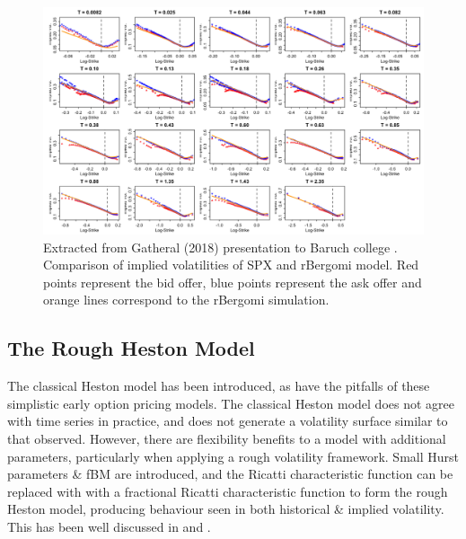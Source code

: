 \documentclass[12pt,oneside]{article}
\begin{document}
\begin{figure}[htpb]
    \centering
    \includegraphics[width=1.0\textwidth ]{figs/Gatheral2018Talk_fig8}
    \caption{Extracted from Gatheral (2018) presentation to Baruch college \cite[Figure~8]{Gatheral2018Talk}. Comparison of implied volatilities of SPX and rBergomi model. Red points represent the bid offer, blue points represent the ask offer and orange lines correspond to the rBergomi simulation.}
    \label{fig:Gatheral2018Talk_fig8}
\end{figure}

\subsection{The Rough Heston Model}
\label{subsec:rough_heston}
The classical Heston model has been introduced, as have the pitfalls  of these simplistic early option pricing models. The classical Heston model does not agree with time series in practice, and does not generate a volatility surface similar to that observed. However, there are flexibility benefits to a model with additional parameters, particularly when applying a rough volatility framework. Small Hurst parameters & fBM are introduced, and the Ricatti characteristic function can be replaced with with a fractional Ricatti characteristic function to form the rough Heston model, producing behaviour seen in both historical & implied volatility. This has been well discussed in \cite{OElEuch2018} and \cite{ElEuchRosenbaum2019}.
\\
\end{document}
